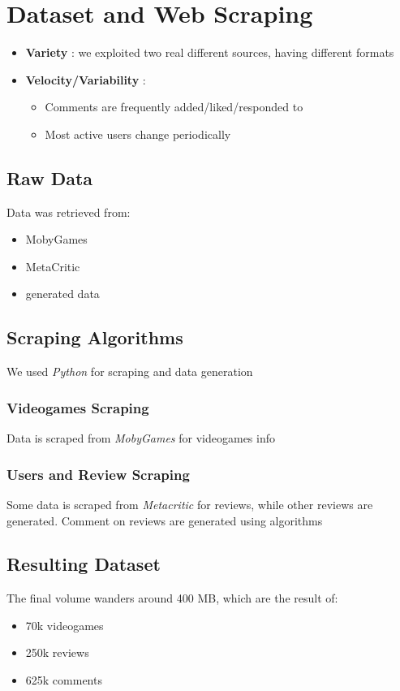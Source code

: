 \chapter{Dataset and Web Scraping}
\begin{itemize}
	\item \textbf{Variety} : we exploited two real different sources, having different formats 
	\item \textbf{Velocity/Variability} : 
	\begin{itemize}
		\item Comments are frequently added/liked/responded to 
		\item Most active users change periodically
	\end{itemize}
\end{itemize}
\section{Raw Data}
Data was retrieved from: 
\begin{itemize}
	\item MobyGames
	\item MetaCritic 
	\item generated data 
\end{itemize}
\section{Scraping Algorithms}
We used \emph{Python} for scraping and data generation
\subsection{Videogames Scraping}
Data is scraped from \emph{MobyGames} for videogames info
\subsection{Users and Review Scraping}
Some data is scraped from \emph{Metacritic} for reviews, while other reviews are generated.
Comment on reviews are generated using algorithms 
\section{Resulting Dataset}
The final volume wanders around 400 MB, which are the result of:
\begin{itemize}
	\item 70k videogames
	\item 250k reviews 
	\item 625k comments
\end{itemize}

